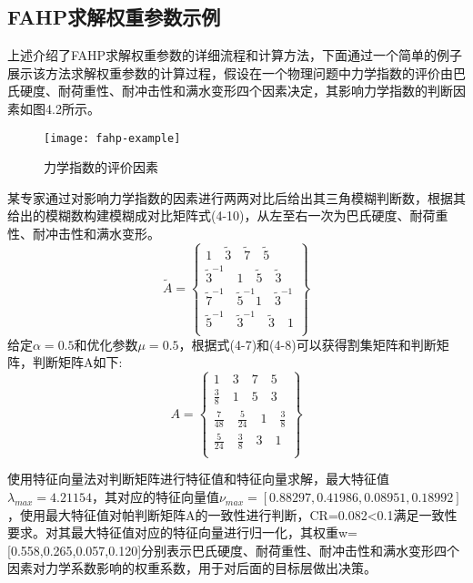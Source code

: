 \subsection{FAHP求解权重参数示例}
上述介绍了FAHP求解权重参数的详细流程和计算方法，下面通过一个简单的例子展示该方法求解权重参数的计算过程，假设在一个物理问题中力学指数的评价由巴氏硬度、耐荷重性、耐冲击性和满水变形四个因素决定，其影响力学指数的判断因素如图4.2所示。
\begin{figure}[H] %
	\centering
	\texttt{[image: fahp-example]}
	\caption{力学指数的评价因素}
	\label{fig:xfig1}
\end{figure}
某专家通过对影响力学指数的因素进行两两对比后给出其三角模糊判断数，根据其给出的模糊数构建模糊成对比矩阵式(4-10)，从左至右一次为巴氏硬度、耐荷重性、耐冲击性和满水变形。
\begin{equation}
\widetilde{A} = \left\{\begin{array}{l}
1 \quad \widetilde{3} \quad \widetilde{7} \quad \widetilde{5}  \\
\widetilde{3}^{-1} \quad 1 \quad \widetilde{5} \quad \widetilde{3} \\
\widetilde{7}^{-1} \quad \widetilde{5}^{-1} 1 \quad \widetilde{3}^{-1} \\
\widetilde{5}^{-1} \quad \widetilde{3}^{-1} \quad \widetilde{3} \quad 1 \\
\end{array}\right\}
\end{equation}
给定$\alpha=0.5$和优化参数$\mu=0.5$，根据式(4-7)和(4-8)可以获得割集矩阵和判断矩阵，判断矩阵A如下:
\begin{equation}
A = \left\{\begin{array}{l}
1 \quad 3 \quad 7 \quad 5 \\
\frac{3}{8} \quad 1 \quad 5 \quad 3 \\
\frac{7}{48} \quad \frac{5}{24} \quad 1 \quad \frac{3}{8} \\
\frac{5}{24} \quad \frac{3}{8} \quad 3 \quad 1 \\
\end{array}\right\}
\end{equation}

使用特征向量法对判断矩阵进行特征值和特征向量求解，最大特征值$\lambda_{max}=4.21154$，其对应的特征向量值$\nu_{max}=[0.88297,0.41986,0.08951,0.18992]$，使用最大特征值对帕判断矩阵A的一致性进行判断，CR=0.082<0.1满足一致性要求。对其最大特征值对应的特征向量进行归一化，其权重w=[0.558,0.265,0.057,0.120]分别表示巴氏硬度、耐荷重性、耐冲击性和满水变形四个因素对力学系数影响的权重系数，用于对后面的目标层做出决策。















